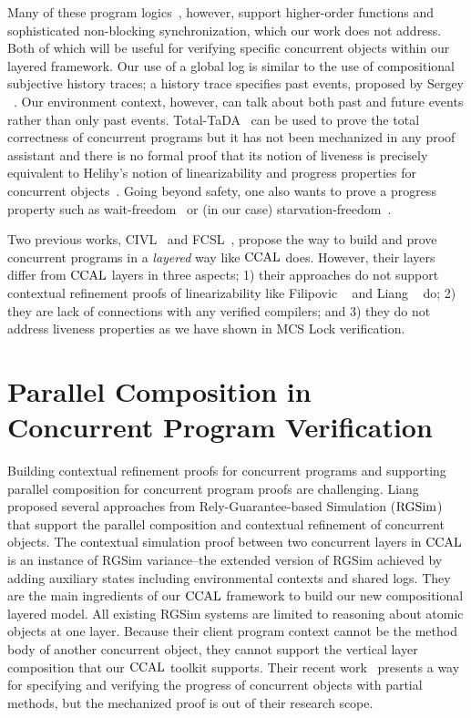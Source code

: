 Many of these program logics~\cite{Turon13popl,iris15}, however, support 
higher-order functions 
and sophisticated non-blocking synchronization,
which our work does not address.
Both of which will be
useful for verifying specific concurrent objects within our layered
framework. 
Our use of a global log is similar to the use of compositional
subjective history traces; a history trace specifies past events, proposed by Sergey \etal~\cite{sergey15}.
Our environment context, however, can talk about both past and future events rather than only past events.
Total-TaDA~\cite{pinto16} can be used to prove
the total correctness of concurrent programs but it has not been
mechanized in any proof assistant and there is no formal proof that
its notion of liveness is precisely equivalent to Helihy's notion of
linearizability and progress properties for concurrent
objects~\cite{Herlihy08book}. 
Going
beyond safety, one also wants to prove a progress property such as
wait-freedom~\cite{herlihy91:waitfree} or (in our case)
starvation-freedom~\cite{Herlihy08book}.

Two previous works, CIVL~\cite{civl15} and FCSL~\cite{sergey15pldi},
propose the way to build and prove concurrent programs in a \textit{layered} way like $\mathrm{CCAL}$ does. 
However, their layers differ from $\mathrm{CCAL}$ layers in three aspects;
1) their approaches do not support contextual refinement proofs of linearizability like Filipovic \etal~\cite{filipovic10} and Liang \etal~\cite{liang13} do;
2) they are lack of connections with any verified compilers; and
3) they do not address liveness properties as we have shown in MCS Lock verification.



\section{Parallel Composition in Concurrent Program Verification}
\label{chatper:related:sec:parallel-composition-in-concurrent-program-verification}

Building contextual refinement proofs for concurrent programs and supporting parallel composition for concurrent program proofs 
are challenging.
Liang \etal~\cite{RGSim,Liang14lics,lili16, liang:2017} 
proposed several approaches from Rely-Guarantee-based Simulation ($\mathrm{RGSim}$) 
that support the parallel
composition and  contextual refinement of concurrent
objects.
The contextual simulation proof between two concurrent layers in $\mathrm{CCAL}$ 
is an instance of RGSim variance--the extended version of RGSim achieved by adding auxiliary states including environmental contexts and shared logs. 
They are the main ingredients of our $\mathrm{CCAL}$ framework 
to build our new  compositional
layered model.
All existing RGSim systems are limited to reasoning
about atomic objects at one layer.
Because their client program context cannot 
be the method body of another concurrent object, 
they cannot
support the vertical layer composition that our $\mathrm{CCAL}$ toolkit supports.
Their recent work~\cite{liang:2017} presents a way for specifying and verifying the progress of concurrent objects with partial methods, but the mechanized proof is out of their research scope. 

